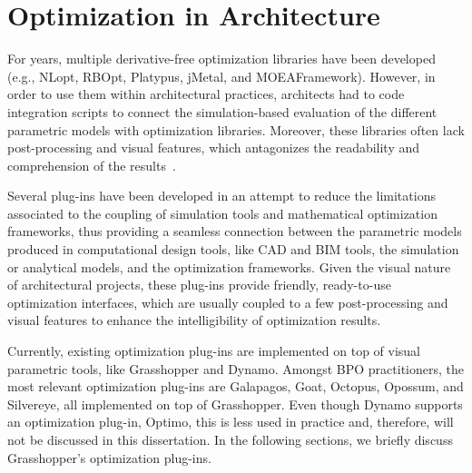 	
	\section{Optimization in Architecture}	
	\label{sec:optimizationtools}
	
	For years, multiple derivative-free optimization libraries have been developed (e.g., NLopt, RBOpt, Platypus, jMetal, and MOEAFramework). However, in order to use them within architectural practices, architects had to code integration scripts to connect the simulation-based evaluation of the different parametric models with optimization libraries. Moreover, these libraries often lack post-processing and visual features, which antagonizes the readability and comprehension of the results~\cite{Attia2013,Nguyen2014}.
	
	Several plug-ins have been developed in an attempt to reduce the limitations associated to the coupling of simulation tools and mathematical optimization frameworks, thus providing a seamless connection between the parametric models produced in computational design tools, like \ac{CAD} and \ac{BIM} tools, the simulation or analytical models, and the optimization frameworks. Given the visual nature of architectural projects, these plug-ins provide friendly, ready-to-use optimization interfaces, which are usually coupled to a few post-processing and visual features to enhance the intelligibility of optimization results. 
	
	Currently, existing optimization plug-ins are implemented on top of visual parametric tools, like Grasshopper and Dynamo. Amongst \ac{BPO} practitioners, the most relevant optimization plug-ins are Galapagos, Goat, Octopus, Opossum, and Silvereye, all implemented on top of Grasshopper. Even though Dynamo supports an optimization plug-in, Optimo, this is less used in practice and, therefore, will not be discussed in this dissertation. In the following sections, we briefly discuss Grasshopper's optimization plug-ins. 
	
